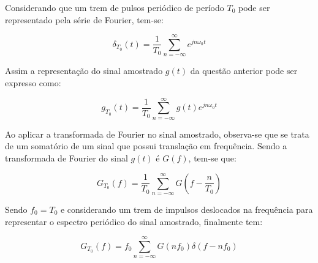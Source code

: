 Considerando que um trem de pulsos periódico de período $T_0$ pode ser representado pela série de Fourier, tem-se:

\begin{equation}
    \delta_{T_0}(t) = \frac{1}{T_0} \sum_{n = -\infty}^{\infty} e^{jn\omega_0t}
\end{equation}

Assim a representação do sinal amostrado $g(t)$ da questão anterior pode ser expresso como:

\begin{equation}
     g_{T_0}(t) = \frac{1}{T_0} \sum_{n = -\infty}^{\infty} g(t)e^{jn\omega_0t}
\end{equation}

Ao aplicar a transformada de Fourier no sinal amostrado, observa-se que se trata de um somatório de um sinal que possui translação em frequência. Sendo a transformada de Fourier do sinal $g(t)$ é $G(f)$, tem-se que:

\begin{equation}
     G_{T_0}(f) = \frac{1}{T_0} \sum_{n = -\infty}^{\infty} G(f-\frac{n}{T_0})
\end{equation}

Sendo $f_0=T_0$ e considerando um trem de impulsos deslocados na frequência para representar o espectro periódico do sinal amostrado, finalmente tem:

\begin{equation}
     G_{T_0}(f) = f_0 \sum_{n = -\infty}^{\infty} G(nf_0)\delta(f-nf_0) 
\end{equation}
